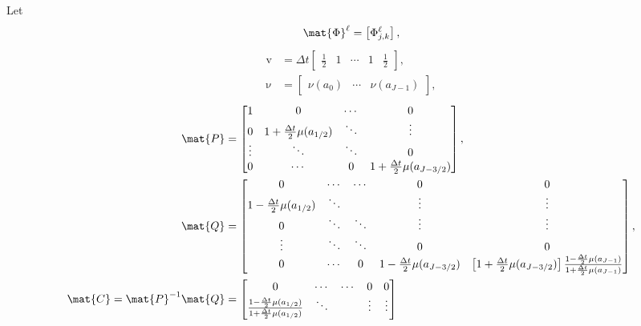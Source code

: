 \documentclass{jpmarticle}
\renewcommand{\vec}[1]{\boldsymbol{\mathrm{#1}}}
\begin{document}
Let
\begin{equation}
  \mat{\Phi}^{\ell}
  = \left[\Phi_{j, k}^{\ell}\right],
\end{equation}
\begin{equation}
  \begin{split}
    \vec{v} &=
    \Delta t
    \begin{bmatrix}
      \frac{1}{2} & 1 & \cdots & 1 & \frac{1}{2}
    \end{bmatrix},
    \\
    \vec{\nu} &=
    \begin{bmatrix}
      \nu(a_0) & \cdots & \nu(a_{J - 1})
    \end{bmatrix},
  \end{split}
\end{equation}
\begin{equation}
  \begin{split}
    \mat{P} &=
    \begin{bmatrix}
      1 & 0 & \cdots & 0
      \\
      0 & 1 + \frac{\Delta t}{2} \mu(a_{1 / 2}) &
      \ddots & \vdots
      \\
      \vdots & \ddots & \ddots & 0
      \\
      0 & \cdots & 0 &
      1 + \frac{\Delta t}{2} \mu(a_{J - 3 / 2})
    \end{bmatrix},
    \\
    \mat{Q} &=
    \begin{bmatrix}
      0 & \cdots & \cdots & 0 & 0
      \\
      1 - \frac{\Delta t}{2} \mu(a_{1 / 2}) & \ddots &
      & \vdots & \vdots
      \\
      0 & \ddots & \ddots & \vdots & \vdots
      \\
      \vdots & \ddots & \ddots & 0 & 0
      \\
      0 & \cdots & 0
      & 1 - \frac{\Delta t}{2} \mu(a_{J - 3 / 2})
      & \left[1 + \frac{\Delta t}{2} \mu(a_{J - 3 / 2})\right]
      \frac{1 - \frac{\Delta t}{2} \mu(a_{J - 1})}
      {1 + \frac{\Delta t}{2} \mu(a_{J - 1})}
    \end{bmatrix},
    \\
    \mat{C} = \mat{P}^{-1} \mat{Q}
    &=
    \begin{bmatrix}
      0 & \cdots & \cdots & 0 & 0
      \\
      \frac{1 - \frac{\Delta t}{2} \mu(a_{1 / 2})}
      {1 + \frac{\Delta t}{2} \mu(a_{1 / 2})}
      & \ddots & & \vdots & \vdots
      \\

\end{bmatrix}
\end{split}
\end{equation}
\end{document}
